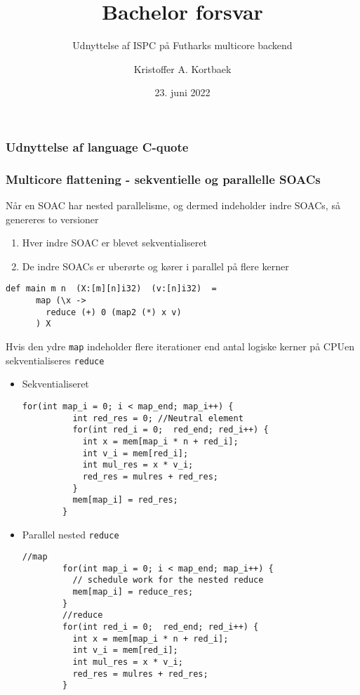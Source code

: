 \documentclass{beamer}
\title{Bachelor forsvar}
\subtitle{Udnyttelse af ISPC på Futharks multicore backend}
\author{Kristoffer A. Kortbaek}
\date{23. juni 2022}
\begin{document}
\begin{frame}
  \titlepage
\end{frame}

\begin{frame}
  \frametitle{Udnyttelse af language C-quote}
\end{frame}

\begin{frame}[fragile]
  \frametitle{Multicore flattening - sekventielle og parallelle SOACs}
  Når en SOAC har nested parallelisme, og dermed indeholder indre SOACs, så genereres to versioner
  \begin{enumerate}
    \item{Hver indre SOAC er blevet sekventialiseret}
    \item{De indre SOACs er uberørte og kører i parallel på flere kerner}
  \end{enumerate}

  \begin{lstlisting}[language=futhark]
    def main m n  (X:[m][n]i32)  (v:[n]i32)  =
      map (\x ->
        reduce (+) 0 (map2 (*) x v)
      ) X
    \end{lstlisting}
    Hvis den ydre \texttt{map} indeholder flere iterationer end antal logiske kerner på CPUen sekventialiseres \texttt{reduce}

  \end{frame}

\begin{frame}[fragile]
  \begin{itemize}
  \item Sekventialiseret
    \begin{lstlisting}[language=ispc]
        for(int map_i = 0; i < map_end; map_i++) {
          int red_res = 0; //Neutral element
          for(int red_i = 0;  red_end; red_i++) {
            int x = mem[map_i * n + red_i];
            int v_i = mem[red_i];
            int mul_res = x * v_i;
            red_res = mulres + red_res;
          }
          mem[map_i] = red_res;
        }
      \end{lstlisting}
    \item Parallel nested \texttt{reduce}
      \begin{lstlisting}[language=ispc]
        //map
        for(int map_i = 0; i < map_end; map_i++) {
          // schedule work for the nested reduce
          mem[map_i] = reduce_res;
        }
        //reduce
        for(int red_i = 0;  red_end; red_i++) {
          int x = mem[map_i * n + red_i];
          int v_i = mem[red_i];
          int mul_res = x * v_i;
          red_res = mulres + red_res;
        }
      \end{lstlisting}

  \end{itemize}

\end{frame}
\end{document}
